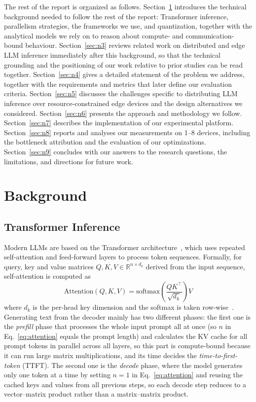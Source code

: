 \documentclass[11pt,a4paper]{article}
\begin{document}
The rest of the report is organized as follows. Section~\ref{sec:n2} introduces the technical background needed to follow the rest of the report: Transformer inference, parallelism strategies, the frameworks we use, and quantization, together with the analytical models we rely on to reason about compute- and communication-bound behaviour. Section~\ref{sec:n3} reviews related work on distributed and edge LLM inference immediately after this background, so that the technical grounding and the positioning of our work relative to prior studies can be read together. Section~\ref{sec:n4} gives a detailed statement of the problem we address, together with the requirements and metrics that later define our evaluation criteria. Section~\ref{sec:n5} discusses the challenges specific to distributing LLM inference over resource-constrained edge devices and the design alternatives we considered. Section~\ref{sec:n6} presents the approach and methodology we follow. Section~\ref{sec:n7} describes the implementation of our experimental platform. Section~\ref{sec:n8} reports and analyses our measurements on 1--8 devices, including the bottleneck attribution and the evaluation of our optimizations. Section~\ref{sec:n9} concludes with our answers to the research questions, the limitations, and directions for future work.

\section{Background}\label{sec:n2}

\subsection{Transformer Inference}\label{sec:n2_1} %

Modern LLMs are based on the Transformer architecture~\cite{vaswani2017attention}, which uses repeated self-attention and feed-forward layers to process token sequences. Formally, for query, key and value matrices $Q, K, V \in \mathbb{R}^{n \times d_k}$ derived from the input sequence, self-attention is computed as
\begin{equation}
\text{Attention}(Q,K,V) = \text{softmax}\!\left(\frac{QK^{\top}}{\sqrt{d_k}}\right)V
\label{eq:attention}
\end{equation}
where $d_k$ is the per-head key dimension and the softmax is taken row-wise~\cite{vaswani2017attention}. Generating text from the decoder mainly has two different phases: the first one is the \emph{prefill} phase that processes the whole input prompt all at once (so $n$ in Eq.~\ref{eq:attention} equals the prompt length) and calculates the KV cache for all prompt tokens in parallel across all layers, so this part is compute-bound because it can run large matrix multiplications, and its time decides the \emph{time-to-first-token} (TTFT). The second one is the \emph{decode} phase, where the model generates only one token at a time by setting $n=1$ in Eq.~\ref{eq:attention} and reusing the cached keys and values from all previous steps, so each decode step reduces to a vector--matrix product rather than a matrix--matrix product.
\end{document}
